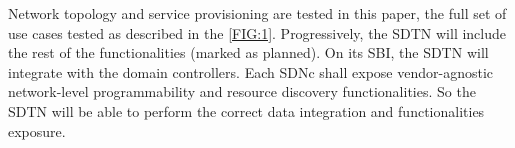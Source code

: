 \documentclass[10pt, conference]{IEEEtran}
\begin{document}

Network topology and service provisioning are tested in this paper, the full set of use cases tested as described in the \cref{FIG:1}. Progressively, the SDTN will include the rest of the functionalities (marked as planned). On its SBI, the SDTN will integrate with the domain controllers. Each SDNc shall expose vendor-agnostic network-level programmability and resource discovery functionalities. So the SDTN will be able to perform the correct data integration and functionalities exposure.
\end{document}
